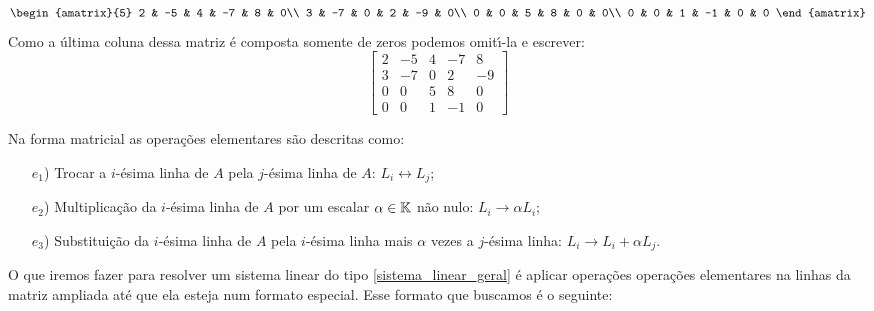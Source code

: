 \begin{exemplos}
\begin{solucao}
\begin{enumerate}[label={\arabic*})]
\[\begin{amatrix}{5}
                        2 & -5 & 4 & -7 & 8 & 0\\
                        3 & -7 & 0 & 2 & -9 & 0\\
                        0 & 0 & 5 & 8 & 0 & 0\\
                        0 & 0 & 1 & -1 & 0 & 0
                    \end{amatrix}
                \]
                Como a \'ultima coluna dessa matriz \'e composta somente de zeros podemos omit{\'\i}-la e escrever:
                \[
                    \begin{bmatrix}
                        2 & -5 & 4 & -7 & 8\\
                        3 & -7 & 0 & 2 & -9\\
                        0 & 0 & 5 & 8 & 0\\
                        0 & 0 & 1 & -1 & 0 
                    \end{bmatrix}
                \]

        \end{enumerate}
    \end{solucao}
\end{exemplos}
Na forma matricial as opera\c{c}\~oes elementares s\~ao descritas como:

\vspace{.3cm}

\begin{itemize}
    \item[$e_1$)] Trocar a $i$-\'esima linha de $A$ pela $j$-\'esima linha de $A$: $L_i \leftrightarrow L_j$;

    \item[$e_2$)] Multiplica\c{c}\~ao da $i$-\'esima linha de $A$ por um escalar $\alpha \in \mathbb{K}$ n\~ao nulo: $L_i \rightarrow \alpha L_i$;

   \item[$e_3$)] Substitui\c{c}\~ao da $i$-\'esima linha de $A$ pela $i$-\'esima linha mais $\alpha$ vezes a $j$-\'esima linha: $L_i \rightarrow L_i + \alpha L_j$.
\end{itemize}

O que iremos fazer para resolver um sistema linear do tipo \eqref{sistema_linear_geral} \'e aplicar opera\c{c}\~oes opera\c{c}\~oes elementares na linhas da matriz ampliada at\'e que ela esteja num formato especial. Esse formato que buscamos \'e o seguinte:

